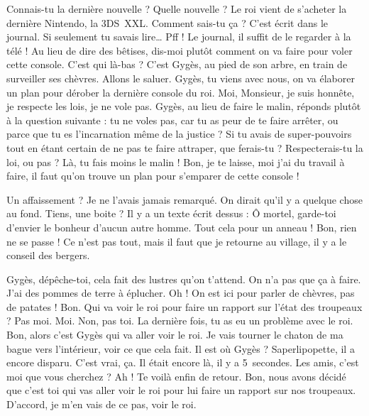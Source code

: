 \documentclass[12pt, a5paper, french]{memoir}
\begin{document}
\StageDir{\G, \Vi, \Vj}
\begin{drama}
\Vispeaks Connais-tu la dernière nouvelle ?
\Vjspeaks Quelle nouvelle ?
\Vispeaks Le roi vient de s’acheter la dernière Nintendo, la 3DS~XXL.
\Vjspeaks Comment sais-tu ça ?
\Vispeaks C’est écrit dans le journal. Si seulement tu savais lire\dots
\Vjspeaks Pff ! Le journal, il suffit de le regarder à la télé !
\Vispeaks Au lieu de dire des bêtises, dis-moi plutôt comment on va faire pour voler cette console.
\Vjspeaks {} C’est qui là-bas ?
\Vispeaks C’est Gygès, au pied de son arbre, en train de surveiller ses chèvres.
\Vjspeaks Allons le saluer.  Gygès, tu viens avec nous, on va élaborer un plan pour dérober la dernière console du roi.
\Gspeaks Moi, Monsieur, je suis honnête, je respecte les lois, je ne vole pas.
\Vispeaks Gygès, au lieu de faire le malin, réponds plutôt à la question suivante : tu ne voles pas, car tu as peur de te faire arrêter, ou parce que tu es l’incarnation même de la justice ? Si tu avais de super-pouvoirs tout en étant certain de ne pas te faire attraper, que ferais-tu ? Respecterais-tu la loi, ou pas ? Là, tu fais moins le malin ! Bon, je te laisse, moi j’ai du travail à faire, il faut qu’on trouve un plan pour s’emparer de cette console !

\scene

\StageDir{\G}
\Gspeaks {} Un affaissement ? Je ne l’avais jamais remarqué. On dirait qu’il y a quelque chose au fond. Tiens, une boite ? Il y a un texte écrit dessus : \og Ô mortel, garde-toi d’envier le bonheur d’aucun autre homme. \fg{}  Tout cela pour un anneau !  Bon, rien ne se passe ! Ce n’est pas tout, mais il faut que je retourne au village, il y a le conseil des bergers.

\scene

\StageDir{\G, \Bi, \Bj, \Bk, \Bl, \Bm}
\Bispeaks {} Gygès, dépêche-toi, cela fait des lustres qu’on t’attend. On n’a pas que ça à faire. J’ai des pommes de terre à éplucher.
\Bjspeaks Oh ! On est ici pour parler de chèvres, pas de patates !
\Bkspeaks Bon. Qui va voir le roi pour faire un rapport sur l'état des troupeaux ?
\Blspeaks Pas moi.
\Bmspeaks Moi.
\Bjspeaks Non, pas toi. La dernière fois, tu as eu un problème avec le roi.
\Bispeaks Bon, alors c’est Gygès qui va aller voir le roi.
\Gspeaks {} Je vais tourner le chaton de ma bague vers l’intérieur, voir ce que cela fait.
\Bispeaks Il est où Gygès ? Saperlipopette, il a encore disparu.
\Blspeaks C’est vrai, ça. Il était encore là, il y a 5~secondes.
\Gspeaks {} Les amis, c’est moi que vous cherchez ?
\Bmspeaks Ah ! Te voilà enfin de retour. Bon, nous avons décidé que c’est toi qui vas aller voir le roi pour lui faire un rapport sur nos troupeaux.
\Gspeaks D’accord, je m’en vais de ce pas, voir le roi.


\end{drama}
\end{document}
